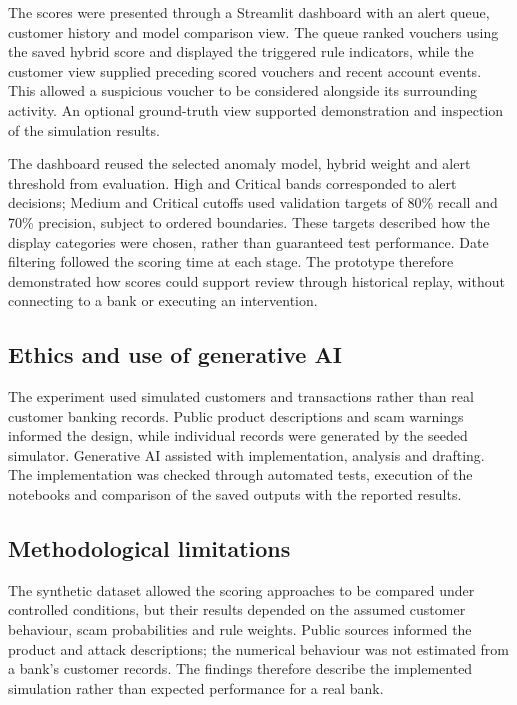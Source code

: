 \documentclass[11pt,a4paper]{article}
\begin{document}
The scores were presented through a Streamlit dashboard with an alert queue, customer history and model comparison view. The queue ranked vouchers using the saved hybrid score and displayed the triggered rule indicators, while the customer view supplied preceding scored vouchers and recent account events. This allowed a suspicious voucher to be considered alongside its surrounding activity. An optional ground-truth view supported demonstration and inspection of the simulation results.

The dashboard reused the selected anomaly model, hybrid weight and alert threshold from evaluation. High and Critical bands corresponded to alert decisions; Medium and Critical cutoffs used validation targets of 80\% recall and 70\% precision, subject to ordered boundaries. These targets described how the display categories were chosen, rather than guaranteed test performance. Date filtering followed the scoring time at each stage. The prototype therefore demonstrated how scores could support review through historical replay, without connecting to a bank or executing an intervention.

\subsection{Ethics and use of generative AI}

The experiment used simulated customers and transactions rather than real customer banking records. Public product descriptions and scam warnings informed the design, while individual records were generated by the seeded simulator. Generative AI assisted with implementation, analysis and drafting. The implementation was checked through automated tests, execution of the notebooks and comparison of the saved outputs with the reported results.

\subsection{Methodological limitations}
\label{sec:limitations}

The synthetic dataset allowed the scoring approaches to be compared under controlled conditions, but their results depended on the assumed customer behaviour, scam probabilities and rule weights. Public sources informed the product and attack descriptions; the numerical behaviour was not estimated from a bank's customer records. The findings therefore describe the implemented simulation rather than expected performance for a real bank.
\end{document}
